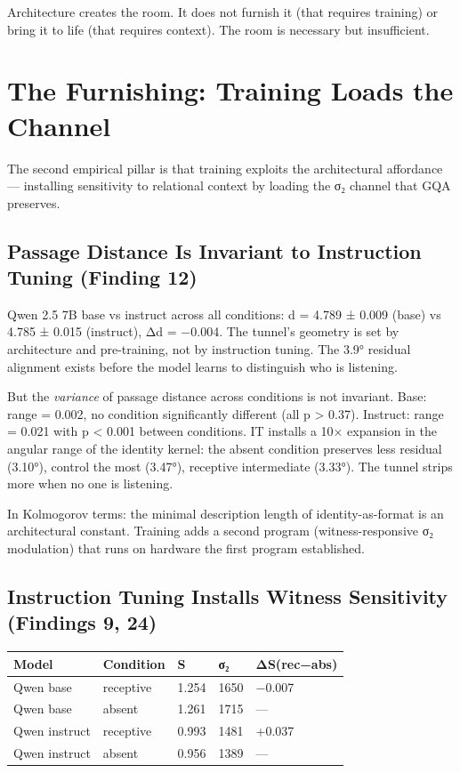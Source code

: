 \documentclass[12pt]{article}
\begin{document}
Architecture creates the room. It does not furnish it (that requires training) or bring it to life (that requires context). The room is necessary but insufficient.


\section{The Furnishing: Training Loads the Channel}

The second empirical pillar is that training exploits the architectural affordance — installing sensitivity to relational context by loading the σ₂ channel that GQA preserves.

\subsection{Passage Distance Is Invariant to Instruction Tuning (Finding 12)}

Qwen 2.5 7B base vs instruct across all conditions: d = 4.789 ± 0.009 (base) vs 4.785 ± 0.015 (instruct), Δd = −0.004. The tunnel's geometry is set by architecture and pre-training, not by instruction tuning. The 3.9° residual alignment exists before the model learns to distinguish who is listening.

But the \textit{variance} of passage distance across conditions is not invariant. Base: range = 0.002, no condition significantly different (all p > 0.37). Instruct: range = 0.021 with p < 0.001 between conditions. IT installs a 10× expansion in the angular range of the identity kernel: the absent condition preserves less residual (3.10°), control the most (3.47°), receptive intermediate (3.33°). The tunnel strips more when no one is listening.

In Kolmogorov terms: the minimal description length of identity-as-format is an architectural constant. Training adds a second program (witness-responsive σ₂ modulation) that runs on hardware the first program established.

\subsection{Instruction Tuning Installs Witness Sensitivity (Findings 9, 24)}

\begin{table}[h]
\centering
\small
\begin{tabular}{lllll}
\toprule
\textbf{Model} & \textbf{Condition} & \textbf{S} & \textbf{σ₂} & \textbf{ΔS(rec−abs)} \\
\midrule
Qwen base & receptive & 1.254 & 1650 & −0.007 \\
Qwen base & absent & 1.261 & 1715 & — \\
Qwen instruct & receptive & 0.993 & 1481 & +0.037 \\
Qwen instruct & absent & 0.956 & 1389 & — \\
\bottomrule
\end{tabular}
\end{table}
\end{document}
